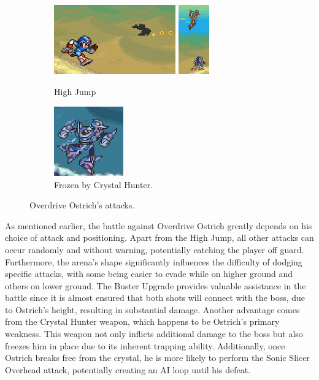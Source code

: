 \begin{figure}[htp]
	\ContinuedFloat
	\centering
	\begin{subfigure}{\linewidth}
		\centering
		\includegraphics[height=3cm]{figures/X2/Overdrive_ostrich/Ostrich_background_2.png}
		\includegraphics[height=3cm]{figures/X2/Overdrive_ostrich/Ostrich_background.png}
		\caption{High Jump}
	\end{subfigure}
	\begin{subfigure}{0.4\linewidth}
		\centering
		\includegraphics[height= 3cm]{figures/X2/Overdrive_ostrich/Ostrich_freeze.png}
		\caption{Frozen by Crystal Hunter.}
	\end{subfigure}
	\caption{Overdrive Ostrich's attacks.}	
\end{figure}

As mentioned earlier, the battle against Overdrive Ostrich greatly depends on his choice of attack and positioning. Apart from the High Jump, all other attacks can occur randomly and without warning, potentially catching the player off guard. Furthermore, the arena's shape significantly influences the difficulty of dodging specific attacks, with some being easier to evade while on higher ground and others on lower ground. The Buster Upgrade provides valuable assistance in the battle since it is almost ensured that both shots will connect with the boss, due to Ostrich's height, resulting in substantial damage. Another advantage comes from the Crystal Hunter weapon, which happens to be Ostrich's primary weakness. This weapon not only inflicts additional damage to the boss but also freezes him in place due to its inherent trapping ability. Additionally, once Ostrich breaks free from the crystal, he is more likely to perform the Sonic Slicer Overhead attack, potentially creating an AI loop until his defeat.

